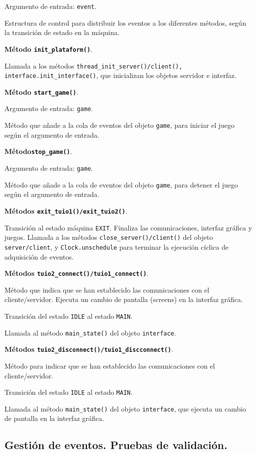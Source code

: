 Argumento de entrada: \texttt{event}.

Estructura de control para distribuir los eventos a los diferentes métodos, según la transición de estado en la máquina.

\textbf{Método \texttt{init\_plataform()}}.

Llamada a los métodos \texttt{thread\_init\_server()/client(), interface.init\_interface()}, que inicializan los objetos servidor e interfaz.

\textbf{Método \texttt{start\_game()}}.

Argumento de entrada: \texttt{game}.

Método que añade a la cola de eventos del objeto \texttt{game}, para iniciar el juego según el argumento de entrada.

\textbf{Método\texttt{stop\_game()}}.

Argumento de entrada: \texttt{game}.

Método que añade a la cola de eventos del objeto \texttt{game}, para detener el juego según el argumento de entrada.

\textbf{Métodos \texttt{exit\_tuio1()/exit\_tuio2()}}.

Transición al estado máquina \texttt{EXIT}.
Finaliza las comunicaciones, interfaz gráfica y juegos.
Llamada a los métodos \texttt{close\_server()/client()} del objeto \texttt{server/client}, y \texttt{Clock.unschedule} para terminar la ejecución cíclica de adquisición de eventos.

\textbf{Métodos \texttt{tuio2\_connect()/tuio1\_connect()}}.

Método que indica que se han establecido las comunicaciones con el cliente/servidor. Ejecuta un cambio de pantalla (screens) en la interfaz gráfica.

Transición del estado \texttt{IDLE} al estado \texttt{MAIN}.

Llamada al método \texttt{main\_state()} del objeto \texttt{interface}.

\textbf{Métodos \texttt{tuio2\_disconnect()/tuio1\_discconnect()}}.

Método para indicar que se han establecido las comunicaciones con el cliente/servidor.

Transición del estado \texttt{IDLE} al estado \texttt{MAIN}.

Llamada al método \texttt{main\_state()} del objeto \texttt{interface}, que ejecuta un cambio de pantalla en la interfaz gráfica.


\subsection{Gestión de eventos. Pruebas de validación.}

